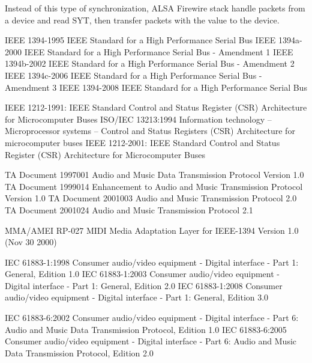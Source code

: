 \documentclass[onecolumn]{article}
\begin{document}
Instead of this type of synchronization, ALSA Firewire stack handle packets from a device and read SYT, then transfer packets with the value to the device.

\newpage

\begin{thebibliography}{99}

IEEE 1394-1995 IEEE Standard for a High Performance Serial Bus
IEEE 1394a-2000 IEEE Standard for a High Performance Serial Bus - Amendment 1
IEEE 1394b-2002 IEEE Standard for a High Performance Serial Bus - Amendment 2
IEEE 1394c-2006 IEEE Standard for a High Performance Serial Bus - Amendment 3
IEEE 1394-2008 IEEE Standard for a High Performance Serial Bus

IEEE 1212-1991: IEEE Standard Control and Status Register (CSR) Architecture for Microcomputer Buses
ISO/IEC 13213:1994 Information technology -- Microprocessor systems -- Control and Status Registers (CSR) Architecture for microcomputer buses
IEEE 1212-2001: IEEE Standard Control and Status Register (CSR) Architecture for Microcomputer Buses

TA Document 1997001 Audio and Music Data Transmission Protocol Version 1.0
TA Document 1999014 Enhancement to Audio and Music Transmission Protocol Version 1.0
TA Document 2001003 Audio and Music Transmission Protocol 2.0
TA Document 2001024 Audio and Music Transmission Protocol 2.1

MMA/AMEI RP-027 MIDI Media Adaptation Layer for IEEE-1394 Version 1.0 (Nov 30 2000)

IEC 61883-1:1998 Consumer audio/video equipment - Digital interface - Part 1: General, Edition 1.0
IEC 61883-1:2003 Consumer audio/video equipment - Digital interface - Part 1: General, Edition 2.0
IEC 61883-1:2008 Consumer audio/video equipment - Digital interface - Part 1: General, Edition 3.0

IEC 61883-6:2002 Consumer audio/video equipment - Digital interface - Part 6: Audio and Music Data Transmission Protocol, Edition 1.0
IEC 61883-6:2005 Consumer audio/video equipment - Digital interface - Part 6: Audio and Music Data Transmission Protocol, Edition 2.0


\end{thebibliography}
\end{document}
